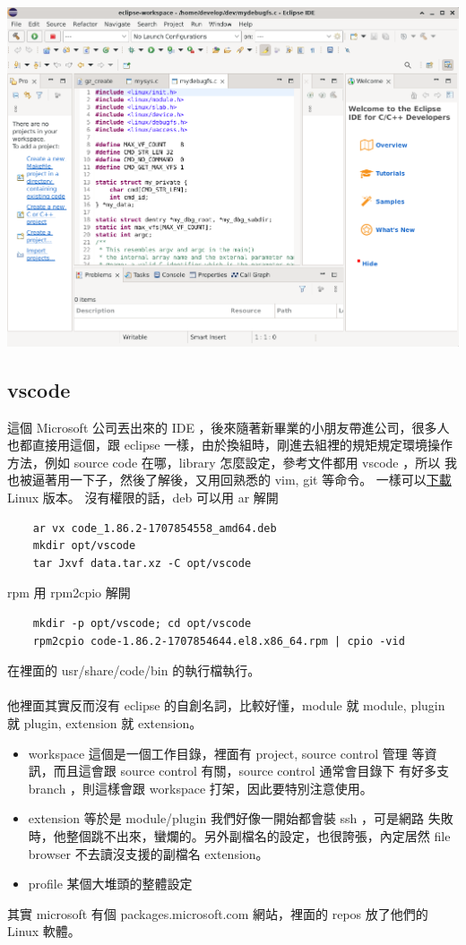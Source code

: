     \includegraphics[width=\textwidth,height=0.6\textwidth]{images/eclipse.png}

    \subsection{vscode}
    這個 Microsoft 公司丟出來的 IDE ，後來隨著新畢業的小朋友帶進公司，很多人
    也都直接用這個，跟 eclipse 一樣，由於換組時，剛進去組裡的規矩規定環境操作
    方法，例如 source code 在哪，library 怎麼設定，參考文件都用 vscode ，所以
    我也被逼著用一下子，然後了解後，又用回熟悉的 vim, git 等命令。
    一樣可以\href{https://code.visualstudio.com/}{下載} Linux 版本。
    沒有權限的話，deb 可以用 ar 解開
    \begin{verbatim}
    ar vx code_1.86.2-1707854558_amd64.deb
    mkdir opt/vscode
    tar Jxvf data.tar.xz -C opt/vscode
    \end{verbatim}
    rpm 用 rpm2cpio 解開
    \begin{verbatim}
    mkdir -p opt/vscode; cd opt/vscode
    rpm2cpio code-1.86.2-1707854644.el8.x86_64.rpm | cpio -vid
    \end{verbatim}
    在裡面的 usr/share/code/bin 的執行檔執行。
    \\\\
    他裡面其實反而沒有 eclipse 的自創名詞，比較好懂，module 就 module, plugin
    就 plugin, extension 就 extension。
    \begin{itemize}
    \item workspace 這個是一個工作目錄，裡面有 project, source control 管理
      等資訊，而且這會跟 source control 有關，source control 通常會目錄下
      有好多支 branch ，則這樣會跟 workspace 打架，因此要特別注意使用。
    \item extension 等於是 module/plugin 我們好像一開始都會裝 ssh ，可是網路
      失敗時，他整個跳不出來，蠻爛的。另外副檔名的設定，也很誇張，內定居然
      file browser 不去讀沒支援的副檔名 extension。
    \item profile 某個大堆頭的整體設定
    \end{itemize}
    其實 microsoft 有個 packages.microsoft.com 網站，裡面的 repos 放了他們的
    Linux 軟體。

